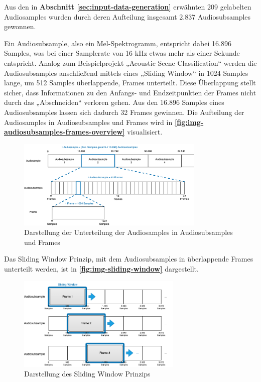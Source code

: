 Aus den in \textbf{Abschnitt \ref{sec:input-data-generation} }erwähnten 209 gelabelten Audiosamples wurden durch deren Aufteilung insgesamt 2.837 Audiosubsamples gewonnen.

Ein Audiosubsample, also ein Mel-Spektrogramm, entspricht dabei 16.896 Samples, was bei einer Samplerate von 16 kHz etwas mehr als einer Sekunde entspricht. Analog zum Beispielprojekt „Acoustic Scene Classification“ \cite{stm-asc}\cite{stm-asc-2} werden die Audiosubsamples anschließend mittels eines „Sliding Window“ in 1024 Samples lange, um 512 Samples überlappende, Frames unterteilt.  Diese Überlappung stellt sicher, dass Informationen zu den Anfangs- und Endzeitpunkten der Frames nicht durch das „Abschneiden“ verloren gehen. Aus den 16.896 Samples eines Audiosubsamples lassen sich dadurch 32 Frames gewinnen. Die Aufteilung der Audiosamples in Audiosubsamples und Frames wird in \textbf{\autoref{fig:img-audiosubsamples-frames-overview}} visualisiert.

\begin{figure}[h!]
\centering
\includegraphics[width=0.8\textwidth]{images/08_durchfuehrung/nn/audiosubsamples_frames_overview.png}
\caption{Darstellung der Unterteilung der Audiosamples in Audiosubsamples und Frames}
\label{fig:img-audiosubsamples-frames-overview}
\end{figure}

\newpage
Das Sliding Window Prinzip, mit dem Audiosubsamples in überlappende Frames unterteilt werden, ist in \textbf{\autoref{fig:img-sliding-window}} dargestellt.

\begin{figure}[h!]
\centering
\includegraphics[width=0.7\textwidth]{images/08_durchfuehrung/nn/sliding_window.png}
\caption{Darstellung des Sliding Window Prinzips}
\label{fig:img-sliding-window}
\end{figure}

